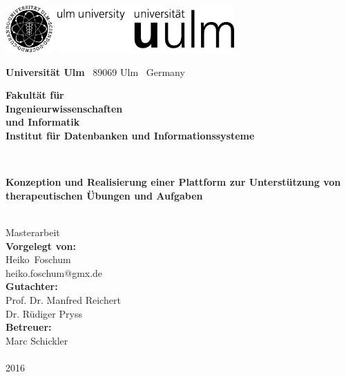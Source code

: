 \documentclass[a4paper,10pt,twoside,openright,DIV=15,BCOR25mm
]{scrbook}
\makeatletter
\newcommand{\fullname}{Heiko~Foschum}
\newcommand{\email}{heiko.foschum@gmx.de}
\newcommand{\titel}{Konzeption und Realisierung  einer Plattform zur Unterstützung  von therapeutischen Übungen  und Aufgaben}
\newcommand{\jahr}{2016}
\newcommand{\gutachterA}{Prof. Dr. Manfred Reichert}
\newcommand{\gutachterB}{Dr. Rüdiger Pryss}
\newcommand{\betreuer}{Marc Schickler}
\newcommand{\fakultaet}{Ingenieurwissenschaften\\und Informatik}
\newcommand{\institut}{Institut für Datenbanken und Informationssysteme}
\makeatother
\begin{document}
\frontmatter


\thispagestyle{empty}
\begin{addmargin*}[4mm]{-10mm}

\includegraphics[height=1.8cm]{images/unilogo_bild}
\hfill
\includegraphics[height=1.8cm]{images/unilogo_wort}\\[1em]

{\footnotesize
{\bfseries Universität Ulm} \textbar ~89069 Ulm \textbar ~Germany
\hspace*{50mm}\parbox[t]{65mm}{\bfseries Fakultät für\\
\fakultaet\\
\mdseries \institut}\\[2cm]

\parbox{140mm}{\bfseries \huge \titel}\\[0.5em]
{\footnotesize Masterarbeit}\\[3em]

{\footnotesize \bfseries Vorgelegt von:}\\
{\footnotesize \fullname\\\email}\\[2em]
{\footnotesize \bfseries Gutachter:}\\ 
{\footnotesize\gutachterA\\
\gutachterB}\\[2em]
{\footnotesize \bfseries Betreuer:}\\ 
{\footnotesize\betreuer}\\\\
{\footnotesize\jahr}
}
\end{addmargin*}
\end{document}
